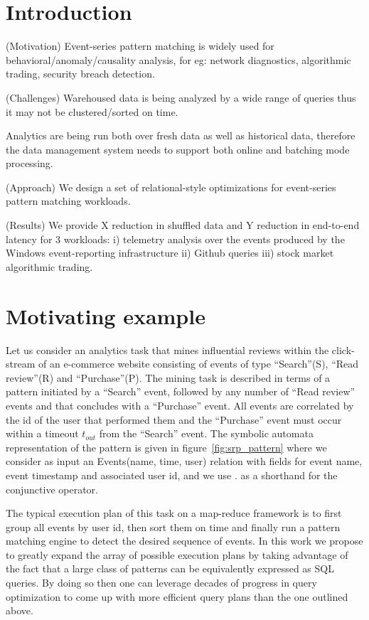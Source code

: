 \section{Introduction}

(Motivation) 
Event-series pattern matching is widely used for behavioral/anomaly/causality
analysis, for eg: network diagnostics, algorithmic
trading, security breach detection.


(Challenges)
Warehoused data is being analyzed by a wide range of queries thus it
may not be clustered/sorted on time. 

Analytics are being run both over fresh data as well as historical data,
therefore the data management system needs to support both online and
batching mode processing.


(Approach)
We design a set of relational-style optimizations for event-series pattern
matching workloads.

(Results)
We provide X reduction in shuffled data and Y reduction in end-to-end latency
for 3 workloads:
i) telemetry analysis over the events produced by the Windows event-reporting
infrastructure
ii) Github queries
iii) stock market algorithmic trading.









\section{Motivating example}

Let us consider an analytics task that mines influential reviews
within the click-stream of an e-commerce website consisting of events of type
``Search''(S), ``Read review''(R) and ``Purchase''(P).
The mining task is described in terms of a pattern initiated by a ``Search''
event, followed by any number of ``Read review'' events and that concludes with
a ``Purchase'' event. 
All events are correlated by the id of the user that performed them and the
``Purchase'' event must occur within a timeout $t_{out}$ from the ``Search'' event. 
The symbolic automata representation of the pattern is given in
figure~\ref{fig:srp_pattern} where we consider as input an Events(name, time,
user) relation with fields for event name, event timestamp and
associated user id, and we use $.$ as a shorthand for the conjunctive operator.

The typical execution plan of this task on a map-reduce framework is to first
group all events by user id, then sort them on time and finally run a pattern
matching engine to detect the desired sequence of events.
In this work we propose to greatly expand the array of possible execution plans
by taking advantage of the fact that a large class of patterns can be
equivalently expressed as SQL queries.
By doing so then one can leverage decades of progress in query optimization to
come up with more efficient query plans than the one outlined above.


